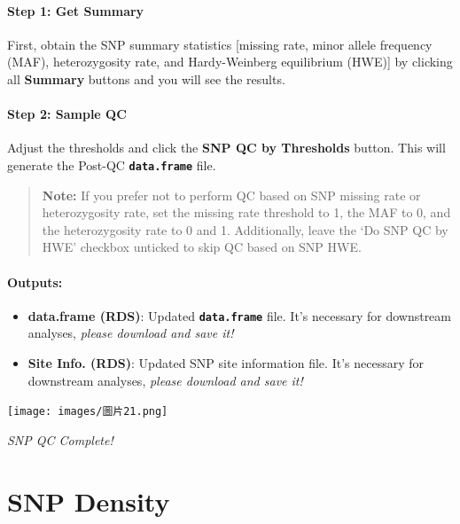 \documentclass[
]{book}
\begin{document}
\paragraph*{Step 1: Get Summary}\label{step-1-get-summary-1}

First, obtain the SNP summary statistics {[}missing rate, minor allele frequency (MAF), heterozygosity rate, and Hardy-Weinberg equilibrium (HWE){]} by clicking all {\textbf{Summary}} buttons and you will see the results.

\paragraph*{Step 2: Sample QC}\label{step-2-sample-qc-1}

Adjust the thresholds and click the {\textbf{SNP QC by Thresholds}} button. This will generate the Post-QC {\textbf{\texttt{data.frame}}} file.

\begin{quote}
\textbf{Note:} If you prefer not to perform QC based on SNP missing rate or heterozygosity rate, set the missing rate threshold to 1, the MAF to 0, and the heterozygosity rate to 0 and 1. Additionally, leave the `Do SNP QC by HWE' checkbox unticked to skip QC based on SNP HWE.
\end{quote}

\paragraph*{Outputs:}\label{outputs-2}

\begin{itemize}
\item
  \textbf{data.frame (RDS)}: Updated {\textbf{\texttt{data.frame}}} file. It's necessary for downstream analyses, \emph{please download and save it!}
\item
  \textbf{Site Info. (RDS)}: Updated SNP site information file. It's necessary for downstream analyses, \emph{please download and save it!}
\end{itemize}

\texttt{[image: images/圖片21.png]}

\emph{SNP QC Complete!}

\section{SNP Density}\label{snp-density}
\end{document}
